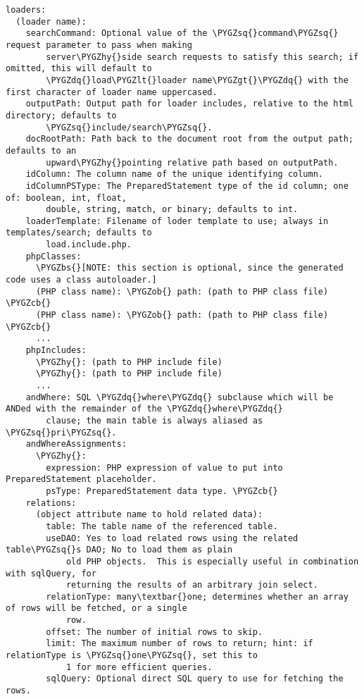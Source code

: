 \documentclass[letterpaper,10pt,english]{sphinxmanual}
\def\PYGZbs{\char`\\}
\def\PYGZob{\char`\{}
\def\PYGZcb{\char`\}}
\def\PYGZlt{\char`\<}
\def\PYGZgt{\char`\>}
\def\PYGZhy{\char`\-}
\def\PYGZsq{\char`\'}
\def\PYGZdq{\char`\"}
\renewcommand\PYGZsq{\textquotesingle}
\begin{document}
\begin{Verbatim}[commandchars=\\\{\}]
loaders:
  (loader name):
    searchCommand: Optional value of the \PYGZsq{}command\PYGZsq{} request parameter to pass when making
        server\PYGZhy{}side search requests to satisfy this search; if omitted, this will default to
        \PYGZdq{}load\PYGZlt{}loader name\PYGZgt{}\PYGZdq{} with the first character of loader name uppercased.
    outputPath: Output path for loader includes, relative to the html directory; defaults to
        \PYGZsq{}include/search\PYGZsq{}.
    docRootPath: Path back to the document root from the output path; defaults to an
        upward\PYGZhy{}pointing relative path based on outputPath.
    idColumn: The column name of the unique identifying column.
    idColumnPSType: The PreparedStatement type of the id column; one of: boolean, int, float,
        double, string, match, or binary; defaults to int.
    loaderTemplate: Filename of loder template to use; always in templates/search; defaults to
        load.include.php.
    phpClasses:
      \PYGZbs{}[NOTE: this section is optional, since the generated code uses a class autoloader.]
      (PHP class name): \PYGZob{} path: (path to PHP class file) \PYGZcb{}
      (PHP class name): \PYGZob{} path: (path to PHP class file) \PYGZcb{}
      ...
    phpIncludes:
      \PYGZhy{}: (path to PHP include file)
      \PYGZhy{}: (path to PHP include file)
      ...
    andWhere: SQL \PYGZdq{}where\PYGZdq{} subclause which will be ANDed with the remainder of the \PYGZdq{}where\PYGZdq{}
        clause; the main table is always aliased as \PYGZsq{}pri\PYGZsq{}.
    andWhereAssignments:
      \PYGZhy{}:
        expression: PHP expression of value to put into PreparedStatement placeholder.
        psType: PreparedStatement data type. \PYGZcb{}
    relations:
      (object attribute name to hold related data):
        table: The table name of the referenced table.
        useDAO: Yes to load related rows using the related table\PYGZsq{}s DAO; No to load them as plain
            old PHP objects.  This is especially useful in combination with sqlQuery, for
            returning the results of an arbitrary join select.
        relationType: many\textbar{}one; determines whether an array of rows will be fetched, or a single
            row.
        offset: The number of initial rows to skip.
        limit: The maximum number of rows to return; hint: if relationType is \PYGZsq{}one\PYGZsq{}, set this to
            1 for more efficient queries.
        sqlQuery: Optional direct SQL query to use for fetching the rows.

\end{Verbatim}
\end{document}
